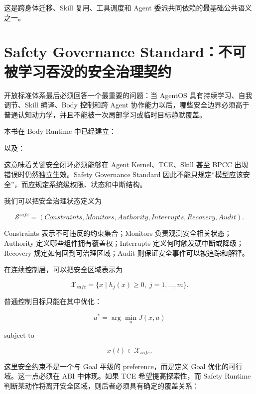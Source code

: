 这是跨身体迁移、Skill 复用、工具调度和 Agent 委派共同依赖的最基础公共语义之一。

\section{Safety Governance Standard：不可被学习吞没的安全治理契约}

开放标准体系最后必须回答一个最重要的问题：当 AgentOS 具有持续学习、自我调节、Skill 编译、Body 控制和跨 Agent 协作能力以后，哪些安全边界必须高于普通认知动力学，并且不能被一次局部学习或临时目标静默覆盖。

本书在 Body Runtime 中已经建立：

\begin{statementbox}
\centering
{}
\end{statementbox}

以及：

\begin{statementbox}
\centering
{}
\end{statementbox}

这意味着关键安全闭环必须能够在 Agent Kernel、TCE、Skill 甚至 BPCC 出现错误时仍然独立生效。Safety Governance Standard 因此不能只规定``模型应该安全''，而应规定系统级权限、状态和中断结构。

我们可以把安全治理状态定义为

\[
\mathcal S^{safe}
=
(
Constraints,
Monitors,
Authority,
Interrupts,
Recovery,
Audit
).
\]

Constraints 表示不可违反的约束集合；Monitors 负责观测安全相关状态；Authority 定义哪些组件拥有覆盖权；Interrupts 定义何时触发硬中断或降级；Recovery 规定如何回到可治理区域；Audit 则保证安全事件可以被追踪和解释。

在连续控制层，可以把安全区域表示为

\[
\mathcal X_{safe}
=
\{x\mid h_j(x)\geq0,\; j=1,\dots,m\}.
\]

普通控制目标只能在其中优化：

\[
u^\ast
=
\arg\min_u J(x,u)
\]

subject to

\[
x(t)\in\mathcal X_{safe}.
\]

这里安全约束不是一个与 Goal 平级的 preference，而是定义 Goal 优化的可行域。这一点必须在 ABI 中体现。如果 TCE 希望提高探索性，而 Safety Runtime 判断某动作将离开安全区域，则后者必须具有确定的覆盖关系：

